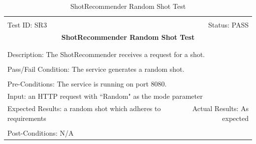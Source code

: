\documentclass[11pt]{article}
\begin{document}
\begin{center}
\begin{table}[H]
\begin{tabular}{|l r|}\hline&\\[-2mm]
	Test ID: SR3	&Status: PASS\\[-3mm]
	\multicolumn{2}{|c|}{\textbf{\large{ShotRecommender Random Shot Test}}}\\&\\\hline&\\[-3mm]
	\multicolumn{2}{|p{\textwidth}|}{Description: The ShotRecommender receives a request for a shot.}\\[1mm]\hline&\\[-3mm]
	\multicolumn{2}{|p{\textwidth}|}{Pass/Fail Condition: The service generates a random shot.}\\[1mm]\hline&\\[-3mm]
	\multicolumn{2}{|p{\textwidth}|}{Pre-Conditions: The service is running on port 8080.}\\[4mm]
	\multicolumn{2}{|p{\textwidth}|}{Input: an HTTP request with ``Random" as the mode parameter}\\[2mm]\hline
	\multicolumn{1}{|p{0.49\textwidth}}{Expected Results: a random shot which adheres to requirements}	&\multicolumn{1}{|p{0.45\textwidth}|}{Actual Results: As expected}\\\hline&\\[-3mm]
	\multicolumn{2}{|p{\textwidth}|}{Post-Conditions: N/A}\\\hline
\end{tabular}
\caption{ShotRecommender Random Shot Test}
\end{table}
\end{center}
\end{document}
